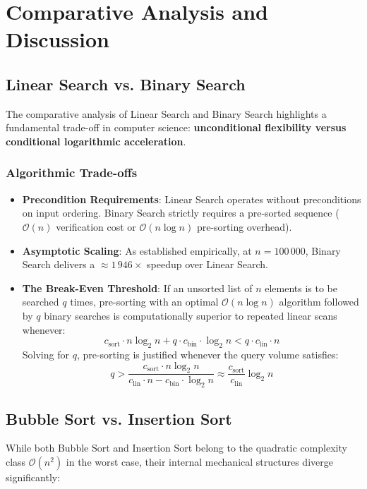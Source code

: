 \chapter{Comparative Analysis and Discussion}
\label{chap:comparative}

\section{Linear Search vs. Binary Search}
The comparative analysis of Linear Search and Binary Search highlights a fundamental trade-off in computer science: \textbf{unconditional flexibility versus conditional logarithmic acceleration}.

\subsection{Algorithmic Trade-offs}
\begin{itemize}
    \item \textbf{Precondition Requirements}: Linear Search operates without preconditions on input ordering. Binary Search strictly requires a pre-sorted sequence ($\mathcal{O}(n)$ verification cost or $\mathcal{O}(n \log n)$ pre-sorting overhead).
    \item \textbf{Asymptotic Scaling}: As established empirically, at $n = 100\,000$, Binary Search delivers a $\approx 1\,946\times$ speedup over Linear Search.
    \item \textbf{The Break-Even Threshold}: If an unsorted list of $n$ elements is to be searched $q$ times, pre-sorting with an optimal $\mathcal{O}(n \log n)$ algorithm followed by $q$ binary searches is computationally superior to repeated linear scans whenever:
    $$c_{\text{sort}} \cdot n \log_2 n + q \cdot c_{\text{bin}} \cdot \log_2 n < q \cdot c_{\text{lin}} \cdot n$$
    Solving for $q$, pre-sorting is justified whenever the query volume satisfies:
    $$q > \frac{c_{\text{sort}} \cdot n \log_2 n}{c_{\text{lin}} \cdot n - c_{\text{bin}} \cdot \log_2 n} \approx \frac{c_{\text{sort}}}{c_{\text{lin}}} \log_2 n$$
\end{itemize}

\section{Bubble Sort vs. Insertion Sort}
While both Bubble Sort and Insertion Sort belong to the quadratic complexity class $\mathcal{O}(n^2)$ in the worst case, their internal mechanical structures diverge significantly:

